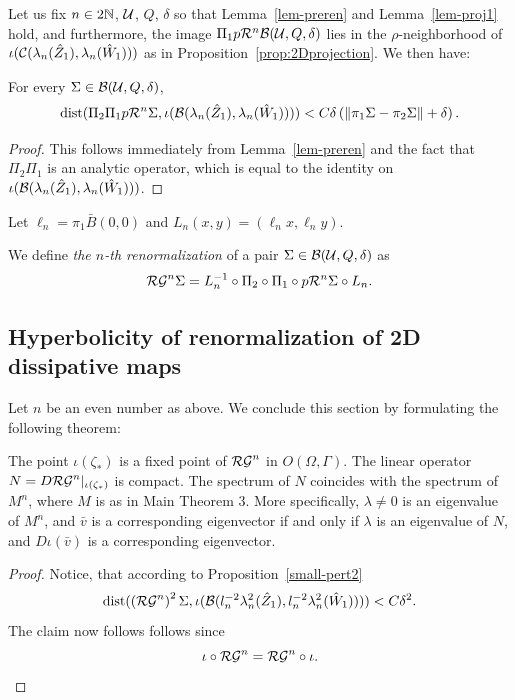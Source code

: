 \noindent
Let us fix $n\in 2{\Bbb N}$, $\mathcal{U}$, $Q$, $\delta$ so that Lemma~\ref{lem-preren} and Lemma~\ref{lem-proj1} hold, and furthermore, the image 
$\Pi_1p\mathcal{R}^n\mathcal{B}(\mathcal{U},Q,\delta)$ lies in the $\rho$-neighborhood of $\iota(\mathcal{C}(\lambda_n(\hat Z_1),\lambda_n(\hat W_1)))$ as in Proposition~\ref{prop:2Dprojection}. We then have:

\begin{prop}
\label{small-pert2}
For every $\Sigma \in \mathcal{B}(\mathcal{U},Q,\delta)$,
$${\rm dist}(\Pi_2\Pi_1 p \mathcal{R}^n \Sigma, \iota(\mathcal{B}(\lambda_n(\hat Z_1),\lambda_n(\hat W_1)))) < C \delta \left( \|\pi_1 \Sigma -\pi_2 \Sigma \|  +\delta \right).$$
\end{prop}
\begin{proof}
This follows immediately from Lemma~\ref{lem-preren} and the fact that $\Pi_2\Pi_1$ is an analytic operator, which is equal to the identity on $\iota(\mathcal{B}(\lambda_n(\hat Z_1),\lambda_n(\hat W_1)))$.
\end{proof}

 Let 
$\ell_n=\pi_1\bar B(0,0)$ and  $L_n(x,y)=(\ell_n x, \ell_n y)$. 
\begin{defn}
 We define {\it the $n$-th renormalization } of a pair $\Sigma \in \mathcal{B}(\mathcal{U},Q,\delta)$ as
\begin{equation}\label{2Drenorm}
\mathcal{RG}^n \Sigma = L_n^{-1} \circ\Pi_2\circ\Pi_1\circ p\mathcal{R}^n \Sigma \circ L_n.
\end{equation}
\end{defn}

\subsection{Hyperbolicity of renormalization of 2D dissipative maps}
Let $n$ be an even number as above. 
We conclude this section by formulating the following theorem:
\begin{thm}
\label{mainthm6}
The point $\iota(\zeta_*)$ is a fixed point of $\mathcal{RG}^n$ in $O(\Omega,\Gamma)$. The linear operator
$N=D \mathcal{RG}^n \arrowvert_{\iota(\zeta_*)}$ is compact. The spectrum of $N$ coincides with the spectrum of $M^n$, where $M$ is as in Main Theorem 3. More
specifically, $\lambda\neq 0$ is an eigenvalue of $M^n$, and $\bar v$ is a corresponding eigenvector if and only if $\lambda$ is an eigenvalue of $N$, and $D\iota(\bar v)$ is a corresponding eigenvector.

\end{thm}
\begin{proof}
Notice, that according to  Proposition~\ref{small-pert2}
$${\rm dist}(\left( \mathcal{RG}^n\right)^2 \Sigma, \iota(\mathcal{B}(l_n^{-2} \lambda_n^2(\hat Z_1),l_n^{-2} \lambda_n^2(\hat W_1)))) < C \delta^2.$$
The claim now follows follows since
$$\iota\circ \mathcal{RG}^n=\mathcal{RG}^n\circ\iota. $$
\end{proof}







